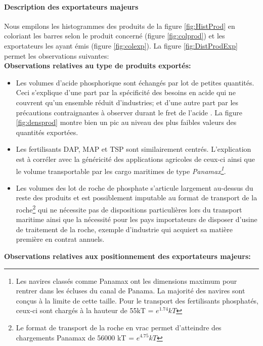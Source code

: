 		\paragraph{Description des exportateurs majeurs\\}
		Nous empilons les histogrammes des produits de la figure \ref{fig:HistProd} en coloriant les barres selon le produit concerné (figure \ref{fig:colprod}) et les exportateurs les ayant émis (figure \ref{fig:colexp}). La figure \ref{fig:DistProdExp} permet les observations suivantes:\\
		\textbf{Observations relatives au type de produits exportés:}
			\begin{itemize}
			\item Les volumes d'acide phosphorique sont échangés par lot de petites quantités. Ceci s'explique d'une part par la spécificité des besoins en acide qui ne couvrent qu'un ensemble réduit d'industries; et d'une autre part par les précautions contraignantes à observer durant le fret de l'acide \cite{acidmax}. La figure \ref{fig:densprod} montre bien un pic au niveau des plus faibles valeurs des quantités exportées.
			\item Les fertilisants DAP, MAP et TSP sont similairement centrés. L’explication est à corréler avec la généricité des applications agricoles de ceux-ci ainsi que le volume transportable par les cargo maritimes de type \textit{Panamax\footnote{Les navires classés comme Panamax ont les dimensions maximum pour rentrer dans les écluses du canal de Panama. La majorité des navires sont conçus à la limite de cette taille. Pour le transport des fertilisants phosphatés, ceux-ci sont chargés à la hauteur de 55kT = $e^{1.74} kT$\cite{panamax}}}.
			\item Les volumes des lot de roche de phosphate s'articule largement au-dessus du reste des produits et est possiblement imputable au format de transport de la roche\footnote{Le format de transport de la roche en vrac permet d'atteindre des chargements Panamax de 56000 kT = $e^{4.75} kT$\cite{rockmax}} qui ne nécessite pas de dispositions particulières lors du transport maritime ainsi que la nécessité pour les pays importateurs de disposer d'usine de traitement de la roche, exemple d'industrie qui acquiert sa matière première en contrat annuels\cite{panamax}.
			\end{itemize}
		\textbf{Observations relatives aux positionnement des exportateurs majeurs:}
